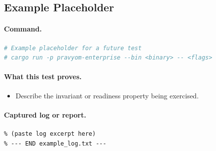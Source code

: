 \subsection{Example Placeholder}

\paragraph{Command.}

\begin{lstlisting}[language=bash]
# Example placeholder for a future test
# cargo run -p pravyom-enterprise --bin <binary> -- <flags>
\end{lstlisting}

\paragraph{What this test proves.}

\begin{itemize}
  \item Describe the invariant or readiness property being exercised.
\end{itemize}

\paragraph{Captured log or report.}

\begin{lstlisting}[language=text]
% --- BEGIN example_log.txt ---
% (paste log excerpt here)
% --- END example_log.txt ---
\end{lstlisting}

% 
